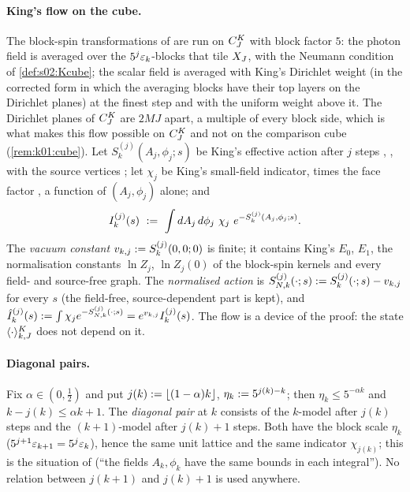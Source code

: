 \paragraph{King's flow on the cube.} The block-spin transformations of \cite[Sect.~2]{K1} are run on $C^{K}_{J}$ with block factor $5$: the photon field is averaged over the $5^{j}\varepsilon_k$-blocks that tile $X_J$, with the Neumann condition of \cref{def:s02:Kcube}; the scalar field is averaged with King's Dirichlet weight \cite[(3.8)--(3.9)]{K2} (in the corrected form in which the averaging blocks have their top layers on the Dirichlet planes) at the finest step and with the uniform weight above it. The Dirichlet planes of $C^{K}_{J}$ are $2MJ$ apart, a multiple of every block side, which is what makes this flow possible on $C^{K}_{J}$ and not on the comparison cube (\cref{rem:k01:cube}). Let $S^{(j)}_k(A_j,\phi_j;s)$ be King's effective action after $j$ steps \cite[(3.14)]{K1}, \cite[(3.12)]{K2}, with the source vertices \cite[(3.20)--(3.21)]{K1}; let $\chi_j$ be King's small-field indicator, \cite[(3.2)]{K1} times the face factor \cite[(5.41)]{K2}, a function of $(A_j,\phi_j)$ alone; and
\[
I^{(j)}_{k}(s)\ :=\ \int dA_j\,d\phi_j\ \chi_j\ e^{-S^{(j)}_k(A_j,\phi_j;s)} .
\]
The \emph{vacuum constant} $v_{k,j}:= S^{(j)}_k(0,0;0)$ is finite; it contains King's $E_0$, $E_1$, the normalisation constants $\ln Z_j$, $\ln Z_j(0)$ of the block-spin kernels and every field- and source-free graph. The \emph{normalised action} is $S^{(j)}_{N,k}(\cdot;s):= S^{(j)}_k(\cdot;s)-v_{k,j}$ for every $s$ (the field-free, source-dependent part is kept), and $\hat I^{(j)}_{k}(s):=\int\chi_je^{-S^{(j)}_{N,k}(\cdot;s)}=e^{v_{k,j}}I^{(j)}_{k}(s)$. The flow is a device of the proof: the state $\langle \cdot\rangle^{K}_{k,J}$ does not depend on it.

\paragraph{Diagonal pairs.} Fix $\alpha\in(0,\frac12)$ and put $j(k):=\lfloor(1-\alpha)k\rfloor$, $\eta_k:=5^{j(k)-k}$; then $\eta_k\le5^{-\alpha k}$ and $k-j(k)\le\alpha k+1$. The \emph{diagonal pair} at $k$ consists of the $k$-model after $j(k)$ steps and the $(k+1)$-model after $j(k)+1$ steps. Both have the block scale $\eta_k$ ($5^{j+1}\varepsilon_{k+1}=5^{j}\varepsilon_k$), hence the same unit lattice and the same indicator $\chi_{j(k)}$; this is the situation of \cite[p.~656]{K1} (``the fields $A_k,\phi_k$ have the same bounds in each integral''). No relation between $j(k+1)$ and $j(k)+1$ is used anywhere.

